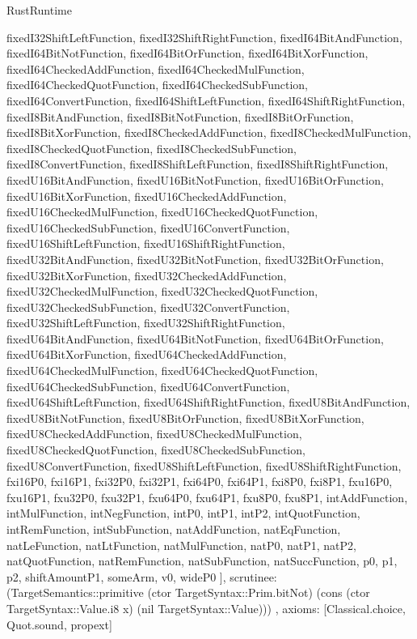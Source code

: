 \begin{lexlean}{RustRuntime}
\begin{semanticmodule}
{{      fixedI32ShiftLeftFunction,
      fixedI32ShiftRightFunction,
      fixedI64BitAndFunction,
      fixedI64BitNotFunction,
      fixedI64BitOrFunction,
      fixedI64BitXorFunction,
      fixedI64CheckedAddFunction,
      fixedI64CheckedMulFunction,
      fixedI64CheckedQuotFunction,
      fixedI64CheckedSubFunction,
      fixedI64ConvertFunction,
      fixedI64ShiftLeftFunction,
      fixedI64ShiftRightFunction,
      fixedI8BitAndFunction,
      fixedI8BitNotFunction,
      fixedI8BitOrFunction,
      fixedI8BitXorFunction,
      fixedI8CheckedAddFunction,
      fixedI8CheckedMulFunction,
      fixedI8CheckedQuotFunction,
      fixedI8CheckedSubFunction,
      fixedI8ConvertFunction,
      fixedI8ShiftLeftFunction,
      fixedI8ShiftRightFunction,
      fixedU16BitAndFunction,
      fixedU16BitNotFunction,
      fixedU16BitOrFunction,
      fixedU16BitXorFunction,
      fixedU16CheckedAddFunction,
      fixedU16CheckedMulFunction,
      fixedU16CheckedQuotFunction,
      fixedU16CheckedSubFunction,
      fixedU16ConvertFunction,
      fixedU16ShiftLeftFunction,
      fixedU16ShiftRightFunction,
      fixedU32BitAndFunction,
      fixedU32BitNotFunction,
      fixedU32BitOrFunction,
      fixedU32BitXorFunction,
      fixedU32CheckedAddFunction,
      fixedU32CheckedMulFunction,
      fixedU32CheckedQuotFunction,
      fixedU32CheckedSubFunction,
      fixedU32ConvertFunction,
      fixedU32ShiftLeftFunction,
      fixedU32ShiftRightFunction,
      fixedU64BitAndFunction,
      fixedU64BitNotFunction,
      fixedU64BitOrFunction,
      fixedU64BitXorFunction,
      fixedU64CheckedAddFunction,
      fixedU64CheckedMulFunction,
      fixedU64CheckedQuotFunction,
      fixedU64CheckedSubFunction,
      fixedU64ConvertFunction,
      fixedU64ShiftLeftFunction,
      fixedU64ShiftRightFunction,
      fixedU8BitAndFunction,
      fixedU8BitNotFunction,
      fixedU8BitOrFunction,
      fixedU8BitXorFunction,
      fixedU8CheckedAddFunction,
      fixedU8CheckedMulFunction,
      fixedU8CheckedQuotFunction,
      fixedU8CheckedSubFunction,
      fixedU8ConvertFunction,
      fixedU8ShiftLeftFunction,
      fixedU8ShiftRightFunction,
      fxi16P0,
      fxi16P1,
      fxi32P0,
      fxi32P1,
      fxi64P0,
      fxi64P1,
      fxi8P0,
      fxi8P1,
      fxu16P0,
      fxu16P1,
      fxu32P0,
      fxu32P1,
      fxu64P0,
      fxu64P1,
      fxu8P0,
      fxu8P1,
      intAddFunction,
      intMulFunction,
      intNegFunction,
      intP0,
      intP1,
      intP2,
      intQuotFunction,
      intRemFunction,
      intSubFunction,
      natAddFunction,
      natEqFunction,
      natLeFunction,
      natLtFunction,
      natMulFunction,
      natP0,
      natP1,
      natP2,
      natQuotFunction,
      natRemFunction,
      natSubFunction,
      natSuccFunction,
      p0,
      p1,
      p2,
      shiftAmountP1,
      someArm,
      v0,
      wideP0
    ],
    scrutinee: (TargetSemantics::primitive (ctor TargetSyntax::Prim.bitNot) (cons (ctor TargetSyntax::Value.i8 x) (nil TargetSyntax::Value)))
  },
  axioms: [Classical.choice, Quot.sound, propext]
}


\end{semanticmodule}
\end{lexlean}
